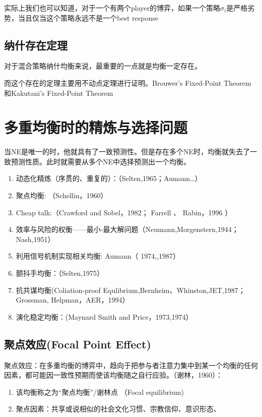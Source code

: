 \documentclass[UTF8,12pt]{ctexart}
\numberwithin{equation}{section} %
\numberwithin{figure}{section}
\numberwithin{table}{section}
\begin{document}
	实际上我们也可以知道，对于一个有两个player的博弈，如果一个策略$\sigma_i$是严格劣势，当且仅当这个策略永远不是一个best response
	
	\subsection{纳什存在定理}
	对于混合策略纳什均衡来说，最重要的一点就是均衡一定存在。
	
	而这个存在的定理主要用不动点定理进行证明。Brouwer’s Fixed-Point Theorem和Kakutani’s Fixed-Point Theorem
	
	\section{多重均衡时的精炼与选择问题}
	当NE是唯一的时，他就具有了一致预测性。但是存在多个NE时，均衡就失去了一致预测性质。此时就需要从多个NE中选择预测出一个均衡。
	
	\begin{enumerate}
		\item 动态化精炼（序贯的、重复的）：（Selten,1965；Aumann…）
		 
		\item 聚点均衡: （Schellin，1960）
		 
		\item Cheap talk:（Crawford and Sobel，1982； Farrell 、 Rabin，1996 ）
		
		\item 效率与风险的权衡——最小-最大解问题（Neumann,Morgenstern,1944；Nash,1951）
		 
		\item 利用信号机制实现相关均衡: Aumann（ 1974,,1987）
		 
		\item 颤抖手均衡：（Selten,1975）
		 
		\item 抗共谋均衡(Coliation-proof Equlibrium,Bernheim、Whinston,JET,1987；Grossman, Helpman，AER，1994）
		 
		\item 演化稳定均衡：(Maynard Smith and Price，1973,1974）
	\end{enumerate}
	
	\subsection{聚点效应(Focal Point Effect)}
	聚点效应：在多重均衡的博弈中，趋向于把参与者注意力集中到某一个均衡的任何因素，都可能因一致性预期而使该均衡随之自行应验。（谢林，1960）：
	\begin{enumerate}
		\item 该均衡称之为“聚点均衡”/谢林点 （Focal equilibrium) 
		
		\item 聚点因素：共享或说相似的社会文化习惯、宗教信仰、意识形态、
	\end{enumerate}
	
\end{document}
